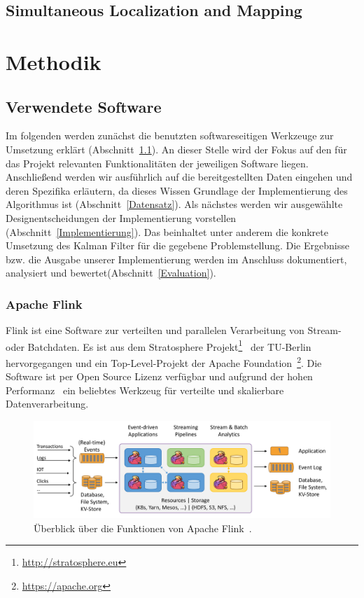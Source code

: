 \documentclass[11pt]{scrartcl}
\begin{document}
\subsection{Simultaneous Localization and Mapping}

\section{Methodik}\label{Methodik}
\subsection{Verwendete Software}\label{Verwendete Software}
Im folgenden werden zunächst die benutzten softwareseitigen Werk\-zeu\-ge zur Umsetzung erklärt (Abschnitt~\ref{Verwendete Software}). An dieser Stelle wird der Fokus auf den für das Projekt relevanten Funktionalitäten der jeweiligen Software liegen. Anschließend werden wir ausführlich auf die bereitgestellten Daten eingehen und deren Spezifika erläutern, da dieses Wissen Grundlage der Implementierung des Algorithmus ist (Abschnitt~\ref{Datensatz}). Als nächstes werden wir ausgewählte Designentscheidungen der Implementierung vorstellen (Abschnitt~\ref{Implementierung}). Das beinhaltet unter anderem die konkrete Umsetzung des Kalman Filter für die gegebene Problemstellung. Die Ergebnisse bzw. die Ausgabe unserer Implementierung werden im Anschluss dokumentiert, analysiert und bewertet(Abschnitt~\ref{Evaluation}).

\subsubsection{Apache Flink}
Flink ist eine Software zur verteilten und parallelen Verarbeitung von Stream- oder Batch\-daten. Es ist aus dem Stratosphere Projekt\footnote{\url{http://stratosphere.eu}}~\cite{alexandrov_stratosphere_2014} der TU-Berlin hervorgegangen und ein Top-Level-Projekt der Apache Foundation~\footnote{\url{https://apache.org}}. Die Software ist per Open Source Lizenz verfügbar und aufgrund der hohen Performanz~\cite{alexandrov_stratosphere_2014} ein beliebtes Werkzeug für verteilte und skalierbare Datenverarbeitung.

\begin{figure}[!t]
	\centering
	\includegraphics[width=5.5in]{flink-home-graphic.png}
	\caption{Überblick über die Funktionen von Apache Flink~\cite{Flink-Overview-Link}.}
	\label{Flink-Überblick}
\end{figure}
\end{document}
